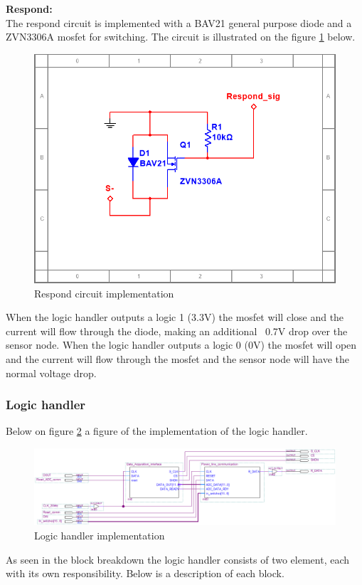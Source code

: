 \textbf{Respond:}\\
The respond circuit is implemented with a BAV21 general purpose diode and a ZVN3306A mosfet for switching. The circuit is illustrated on the figure \ref{fig:respond_Circ} below.

\begin{figure}[H]
	\centering
	\includegraphics[width=.5\textwidth]{billeder/respond_imp}
	\caption{Respond circuit implementation}
	\label{fig:respond_Circ}
\end{figure} 

When the logic handler outputs a logic 1 (3.3V) the mosfet will close and the current will flow through the diode, making an additional ~0.7V drop over the sensor node. When the logic handler outputs a logic 0 (0V) the mosfet will open and the current will flow through the mosfet and the sensor node will have the normal voltage drop.



\subsubsection{Logic handler}
Below on figure \ref{fig:logic_handler_imp} a figure of the implementation of the logic handler. 

\begin{figure}[H]
	\centering
	\includegraphics[width=1\textwidth]{billeder/logic_handler_imp}
	\caption{Logic handler implementation}
	\label{fig:logic_handler_imp}
\end{figure}

As seen in the block breakdown the logic handler consists of two element, each with its own responsibility. Below is a description of each block.

